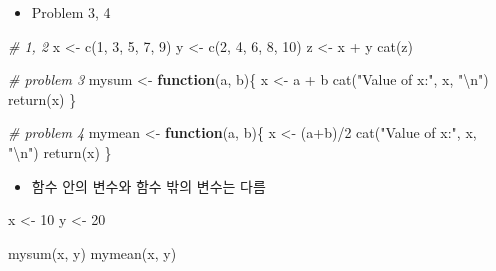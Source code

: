 \documentclass[
]{book}
\newenvironment{Shaded}{\begin{snugshade}}{\end{snugshade}}
\newcommand{\CommentTok}[1]{\textcolor[rgb]{0.56,0.35,0.01}{\textit{#1}}}
\newcommand{\ControlFlowTok}[1]{\textcolor[rgb]{0.13,0.29,0.53}{\textbf{#1}}}
\newcommand{\DecValTok}[1]{\textcolor[rgb]{0.00,0.00,0.81}{#1}}
\newcommand{\FunctionTok}[1]{\textcolor[rgb]{0.00,0.00,0.00}{#1}}
\newcommand{\NormalTok}[1]{#1}
\newcommand{\OtherTok}[1]{\textcolor[rgb]{0.56,0.35,0.01}{#1}}
\newcommand{\SpecialCharTok}[1]{\textcolor[rgb]{0.00,0.00,0.00}{#1}}
\newcommand{\StringTok}[1]{\textcolor[rgb]{0.31,0.60,0.02}{#1}}
\providecommand{\tightlist}{%
  \setlength{\itemsep}{0pt}\setlength{\parskip}{0pt}}
\begin{document}
\begin{itemize}
\tightlist
\item
  Problem 3, 4
\end{itemize}

\begin{Shaded}
\begin{Highlighting}[]
\CommentTok{\# 1, 2}
\NormalTok{x }\OtherTok{\textless{}{-}} \FunctionTok{c}\NormalTok{(}\DecValTok{1}\NormalTok{, }\DecValTok{3}\NormalTok{, }\DecValTok{5}\NormalTok{, }\DecValTok{7}\NormalTok{, }\DecValTok{9}\NormalTok{)}
\NormalTok{y }\OtherTok{\textless{}{-}} \FunctionTok{c}\NormalTok{(}\DecValTok{2}\NormalTok{, }\DecValTok{4}\NormalTok{, }\DecValTok{6}\NormalTok{, }\DecValTok{8}\NormalTok{, }\DecValTok{10}\NormalTok{)}
\NormalTok{z }\OtherTok{\textless{}{-}}\NormalTok{ x }\SpecialCharTok{+}\NormalTok{ y}
\FunctionTok{cat}\NormalTok{(z)}

\CommentTok{\# problem 3}
\NormalTok{mysum }\OtherTok{\textless{}{-}} \ControlFlowTok{function}\NormalTok{(a, b)\{}
\NormalTok{  x }\OtherTok{\textless{}{-}}\NormalTok{ a }\SpecialCharTok{+}\NormalTok{ b}
  \FunctionTok{cat}\NormalTok{(}\StringTok{"Value of x:"}\NormalTok{, x, }\StringTok{"}\SpecialCharTok{\textbackslash{}n}\StringTok{"}\NormalTok{)}
  \FunctionTok{return}\NormalTok{(x)}
\NormalTok{\}}

\CommentTok{\# problem 4}
\NormalTok{mymean }\OtherTok{\textless{}{-}} \ControlFlowTok{function}\NormalTok{(a, b)\{}
\NormalTok{  x }\OtherTok{\textless{}{-}}\NormalTok{ (a}\SpecialCharTok{+}\NormalTok{b)}\SpecialCharTok{/}\DecValTok{2}
  \FunctionTok{cat}\NormalTok{(}\StringTok{"Value of x:"}\NormalTok{, x, }\StringTok{"}\SpecialCharTok{\textbackslash{}n}\StringTok{"}\NormalTok{)}
  \FunctionTok{return}\NormalTok{(x)}
\NormalTok{\}}
\end{Highlighting}
\end{Shaded}

\begin{itemize}
\tightlist
\item
  함수 안의 변수와 함수 밖의 변수는 다름
\end{itemize}

\begin{Shaded}
\begin{Highlighting}[]
\NormalTok{x }\OtherTok{\textless{}{-}} \DecValTok{10}
\NormalTok{y }\OtherTok{\textless{}{-}} \DecValTok{20}

\FunctionTok{mysum}\NormalTok{(x, y)}
\FunctionTok{mymean}\NormalTok{(x, y)}
\end{Highlighting}
\end{Shaded}
\end{document}
